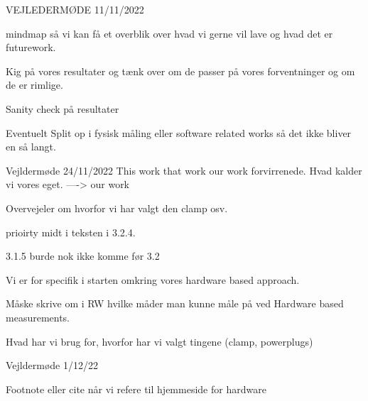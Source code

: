 

VEJLEDERMØDE 11/11/2022

mindmap så vi kan få et overblik over hvad vi gerne vil lave og hvad det er futurework.

Kig på vores resultater og tænk over om de passer på vores forventninger og om de er rimlige. 

Sanity check på resultater

Eventuelt Split op i fysisk måling eller software related works så det ikke bliver en så langt.

Vejldermøde 24/11/2022
This work that work our work forvirrenede. Hvad kalder vi vores eget.
----> our work

Overvejeler om hvorfor vi har valgt den clamp osv.

prioirty midt i teksten i 3.2.4.

3.1.5 burde nok ikke komme før 3.2

Vi er for specifik i starten omkring vores hardware based approach.

Måske skrive om i RW hvilke måder man kunne måle på ved Hardware based measurements.

Hvad har vi brug for, hvorfor har vi valgt tingene (clamp, powerplugs)


Vejldermøde 1/12/22

Footnote eller cite når vi refere til hjemmeside for hardware
